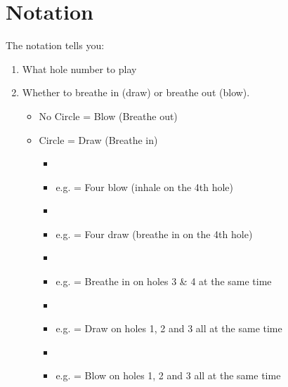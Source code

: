 \section*{Notation}
The notation tells you:
    \begin{enumerate}
        \item What hole number to play 
            
        \item Whether to breathe in (draw) or breathe out (blow).
            \begin{itemize}    
                \item No Circle = Blow (Breathe out)
                \item Circle = Draw (Breathe in)
                    \begin{itemize}
                        \item
                        \item e.g. \four = Four blow (inhale on the 4th hole)
                        \item
                        \item e.g. \4 = Four draw (breathe in on the 4th hole)
                        \item
                        \item e.g. \tfd =  Breathe in on holes 3 & 4 at the same time
                        \item
                        \item e.g. \ottd = Draw on holes 1, 2 and 3 all at the same time 
                        \item
                        \item e.g. \ottb = Blow on holes 1, 2 and 3 all at the same time                    
                    \end{itemize}
                    

                    
            \end{itemize}
    \end{enumerate}
     
